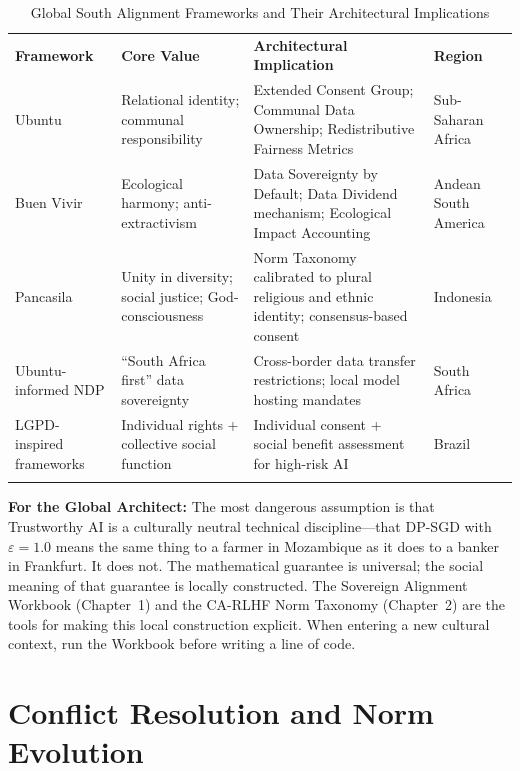 \begin{table}[ht]
\centering
\caption{Global South Alignment Frameworks and Their Architectural Implications}
\label{tab:global_south}
\begin{tabular}{p{2.5cm} p{3.5cm} p{5.0cm} p{1.5cm}}
\hline\noalign{\smallskip}
\textbf{Framework} & \textbf{Core Value} & \textbf{Architectural Implication} & \textbf{Region} \\
\noalign{\smallskip}\svhline\noalign{\smallskip}
Ubuntu & Relational identity; communal responsibility & Extended Consent Group; Communal Data Ownership; Redistributive Fairness Metrics & Sub-Saharan Africa \\[4pt]
Buen Vivir & Ecological harmony; anti-extractivism & Data Sovereignty by Default; Data Dividend mechanism; Ecological Impact Accounting & Andean South America \\[4pt]
Pancasila & Unity in diversity; social justice; God-consciousness & Norm Taxonomy calibrated to plural religious and ethnic identity; consensus-based consent & Indonesia \\[4pt]
Ubuntu-informed NDP & ``South Africa first'' data sovereignty & Cross-border data transfer restrictions; local model hosting mandates & South Africa \\[4pt]
LGPD-inspired frameworks & Individual rights + collective social function & Individual consent + social benefit assessment for high-risk AI & Brazil \\
\noalign{\smallskip}\hline\noalign{\smallskip}
\end{tabular}
\end{table}

\begin{svgraybox}
\textbf{For the Global Architect:} The most dangerous assumption is that Trustworthy AI is a culturally neutral technical discipline---that DP-SGD with $\varepsilon = 1.0$ means the same thing to a farmer in Mozambique as it does to a banker in Frankfurt. It does not. The mathematical guarantee is universal; the social meaning of that guarantee is locally constructed. The Sovereign Alignment Workbook (Chapter~1) and the CA-RLHF Norm Taxonomy (Chapter~2) are the tools for making this local construction explicit. When entering a new cultural context, run the Workbook before writing a line of code.
\end{svgraybox}

\section{Conflict Resolution and Norm Evolution}
\label{sec:norm_evolution}

